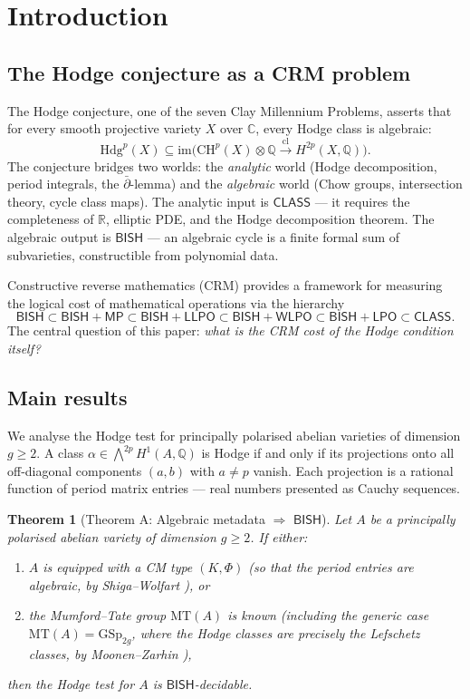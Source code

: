 \documentclass[11pt]{article}
\theoremstyle{plain}
\newtheorem{theorem}{Theorem}[section]
\theoremstyle{definition}
\theoremstyle{remark}
\newcommand{\Q}{\mathbb{Q}}
\newcommand{\R}{\mathbb{R}}
\newcommand{\C}{\mathbb{C}}
\newcommand{\MT}{\mathrm{MT}}
\newcommand{\CH}{\mathrm{CH}}
\newcommand{\Hdg}{\mathrm{Hdg}}
\newcommand{\BISH}{\ensuremath{\mathsf{BISH}}}
\newcommand{\LPO}{\ensuremath{\mathsf{LPO}}}
\newcommand{\WLPO}{\ensuremath{\mathsf{WLPO}}}
\newcommand{\LLPO}{\ensuremath{\mathsf{LLPO}}}
\newcommand{\MP}{\ensuremath{\mathsf{MP}}}
\newcommand{\CLASS}{\ensuremath{\mathsf{CLASS}}}
\begin{document}
\section{Introduction}\label{sec:intro}

\subsection{The Hodge conjecture as a CRM problem}

The Hodge conjecture, one of the seven Clay Millennium Problems, asserts that for every smooth projective variety $X$ over $\C$, every Hodge class is algebraic:
\[
\Hdg^p(X) \subseteq \mathrm{im}\big(\CH^p(X) \otimes \Q \xrightarrow{\mathrm{cl}} H^{2p}(X, \Q)\big).
\]
The conjecture bridges two worlds: the \emph{analytic} world (Hodge decomposition, period integrals, the $\bar\partial$-lemma) and the \emph{algebraic} world (Chow groups, intersection theory, cycle class maps). The analytic input is $\CLASS$ --- it requires the completeness of $\R$, elliptic PDE, and the Hodge decomposition theorem. The algebraic output is $\BISH$ --- an algebraic cycle is a finite formal sum of subvarieties, constructible from polynomial data.

Constructive reverse mathematics (CRM) provides a framework for measuring the logical cost of mathematical operations via the hierarchy
\[
\BISH \subset \BISH + \MP \subset \BISH + \LLPO \subset \BISH + \WLPO \subset \BISH + \LPO \subset \CLASS.
\]
The central question of this paper: \emph{what is the CRM cost of the Hodge condition itself?}

\subsection{Main results}

We analyse the Hodge test for principally polarised abelian varieties of dimension $g \geq 2$. A class $\alpha \in \bigwedge^{2p} H^1(A, \Q)$ is Hodge if and only if its projections onto all off-diagonal components $(a,b)$ with $a \neq p$ vanish. Each projection is a rational function of period matrix entries --- real numbers presented as Cauchy sequences.

\begin{theorem}[Theorem A: Algebraic metadata $\Rightarrow$ $\BISH$]\label{thm:A}
Let $A$ be a principally polarised abelian variety of dimension $g \geq 2$. If either:
\begin{enumerate}[label=(\roman*)]
\item $A$ is equipped with a CM type $(K, \Phi)$ (so that the period entries are algebraic, by Shiga--Wolfart \cite{ShigaWolfart1995}), or
\item the Mumford--Tate group $\MT(A)$ is known (including the generic case $\MT(A) = \mathrm{GSp}_{2g}$, where the Hodge classes are precisely the Lefschetz classes, by Moonen--Zarhin \cite{MoonenZarhin1999}),
\end{enumerate}
then the Hodge test for $A$ is $\BISH$-decidable.
\end{theorem}
\end{document}
